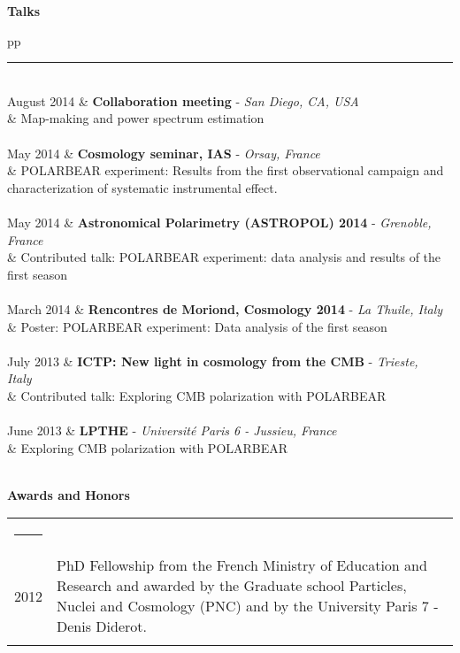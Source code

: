 \documentclass[a4paper,oneside]{article}
\newcommand{\ligne}[1]{\rule[0.5ex]{\textwidth}{#1}\\}
\newcommand{\interRubrique}{\bigskip}
\newcommand{\styleRub}[1]{\noindent\textbf{\large #1}\par}
\newcommand{\indentStd}{\noindent\hspace{\lenA}}
\newenvironment{rubrique}[2][\linewidth] {
    \styleRub{#2}
    \setlength{\lenB}{#1}
    \setlength{\lenC}{\linewidth}
    \addtolength{\lenC}{-\lenA}
    \addtolength{\lenC}{-\lenB}
    \addtolength{\lenC}{-\parindent}
    \addtolength{\lenC}{-9pt}
    \indentStd\begin{tabular}[t]{p{\lenB}p{\lenC}}
}
{\end{tabular}}
\newcommand{\lieu}[1]{\small{\textsl{#1}\ }}
\begin{document}
\interRubrique

\begin{rubrique}[3.4cm]{Talks}
    \ligne{0.1mm}

August 2014
& \textbf{Collaboration meeting} - \lieu{San Diego, CA, USA}\\
& Map-making and power spectrum estimation \\ \\

May 2014
& \textbf{Cosmology seminar, IAS} - \lieu{Orsay, France}\\
& POLARBEAR experiment: Results from the first observational campaign and characterization of systematic instrumental effect. \\ \\

May 2014
& \textbf{Astronomical Polarimetry (ASTROPOL) 2014} - \lieu{Grenoble, France}\\
& Contributed talk: POLARBEAR experiment: data analysis and results of the first season \\ \\

March 2014
& \textbf{Rencontres de Moriond, Cosmology 2014} - \lieu{La Thuile, Italy}\\
& Poster: POLARBEAR experiment:  Data analysis of the first season \\ \\
    
July 2013
& \textbf{ICTP: New light in cosmology from the CMB} - \lieu{Trieste, Italy}\\
& Contributed talk: Exploring CMB polarization with POLARBEAR \\ \\

June 2013
& \textbf{LPTHE} - \lieu{Universit\'e Paris 6 - Jussieu, France}\\
& Exploring CMB polarization with POLARBEAR \\ \\

\end{rubrique}

\interRubrique

\begin{rubrique}[3.4cm]{Awards and Honors}
    \ligne{0.1mm}
2012
& PhD Fellowship from the French Ministry of Education and Research and awarded by the Graduate school Particles, Nuclei and Cosmology (PNC) and by the University Paris 7 - Denis Diderot. \\ \\

\end{rubrique}
\end{document}

